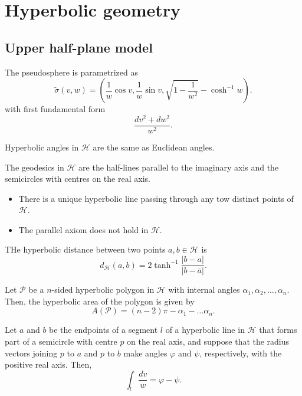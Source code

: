 \section{Hyperbolic geometry}

\subsection{Upper half-plane model}

The pseudosphere is parametrized as
\[
  \tilde{\sigma}(v, w) = \left(
    \frac{1}{w}\cos v,
    \frac{1}{w} \sin v,
    \sqrt{1 - \frac{1}{w^2}} - \cosh^{-1}w
  \right).
\]
with first fundamental form
\[
  \frac{dv^2 + dw^2}{w^2}.
\]

\begin{proposition}
  Hyperbolic angles in $\mathcal{H}$ are the same as Euclidean angles.
\end{proposition}

\begin{proposition}
  The geodesics in $\mathcal{H}$ are the half-lines parallel to the imaginary axis
  and the semicircles with centres on the real axis.
\end{proposition}

\begin{proposition}
  \begin{itemize}
    \item There is a unique hyperbolic line passing through any tow distinct points of $\mathcal{H}$.
    \item The parallel axiom does not hold in $\mathcal{H}$.
  \end{itemize}
\end{proposition}

\begin{proposition}
  THe hyperbolic distance between two points $a, b \in \mathcal{H}$ is
  \[
    d_{\mathcal{H}}(a, b) = 2 \tanh^{-1}\frac{|b - a|}{|b - \overline{a}|}.
  \]
\end{proposition}

\begin{theorem}
  Let $\mathcal{P}$ be a $n$-sided hyperbolic polygon in $\mathcal{H}$ with internal angles
  $\alpha_1, \alpha_2, \dots, \alpha_n$.
  Then, the hyperbolic area of the polygon is given by
  \[
    A(\mathcal{P}) = (n - 2)\pi - \alpha_1 - \dots \alpha_n.
  \]
\end{theorem}

\begin{lemma}
  Let $a$ and $b$ be the endpoints of a segment $l$ of a hyperbolic line in $\mathcal{H}$
  that forms part of a semicircle with centre $p$ on the real axis, and suppose that the
  radius vectors joining $p$ to $a$ and $p$ to $b$ make angles $\varphi$ and $\psi$,
  respectively, with the positive real axis. Then,
  \[
    \int_l \frac{dv}{w}   = \varphi - \psi.
  \]
\end{lemma}

